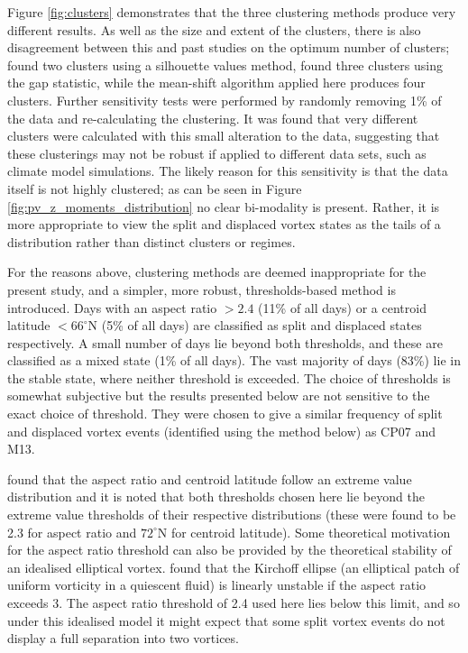 Figure \ref{fig:clusters} demonstrates that the three clustering methods produce
very different results. As well as the size and extent of the clusters, there is
also disagreement between this and past studies on the optimum number of
clusters; \citet{K.Coughlin2009} found two clusters using a silhouette values
method, \citet{Hannachi2010} found three clusters using the gap statistic, while
the mean-shift algorithm applied here produces four clusters. Further
sensitivity tests were performed by randomly removing 1\% of the data and
re-calculating the clustering. It was found that very different clusters were
calculated with this small alteration to the data, suggesting that these
clusterings may not be robust if applied to different data sets, such as climate
model simulations. The likely reason for this sensitivity is that the data
itself is not highly clustered; as can be seen in Figure
\ref{fig:pv_z_moments_distribution} no clear bi-modality is present. Rather, it
is more appropriate to view the split and displaced vortex states as the tails
of a distribution rather than distinct clusters or regimes. 

For the reasons above, clustering methods are deemed inappropriate for the
present study, and a simpler, more robust, thresholds-based method is
introduced. Days with an aspect ratio $>2.4$ (11\% of all days) or a centroid
latitude $<66^{\circ}$N (5\% of all days) are classified as split and displaced
states respectively. A small number of days lie beyond both thresholds, and
these are classified as a mixed state (1\% of all days). The vast majority of
days (83\%) lie in the stable state, where neither threshold is exceeded. The
choice of thresholds is somewhat subjective but the results presented below are
not sensitive to the exact choice of threshold. They were chosen to give a
similar frequency of split and displaced vortex events (identified using the
method below) as CP07 and M13. 

\citet{Mitchell2011} found that the aspect ratio and centroid latitude follow an
extreme value distribution \citep{Cole} and it is noted that both thresholds
chosen here lie beyond the extreme value thresholds of their respective
distributions (these were found to be 2.3 for aspect ratio and $72^{\circ}$N for
centroid latitude). Some theoretical motivation for the aspect ratio threshold
can also be provided by the theoretical stability of an idealised elliptical
vortex. \citet{Love1893} found that the Kirchoff ellipse (an elliptical patch of
uniform vorticity in a quiescent fluid) is linearly unstable if the aspect ratio
exceeds 3. The aspect ratio threshold of 2.4 used here lies below this limit,
and so under this idealised model it might expect that some split vortex events
do not display a full separation into two vortices.

